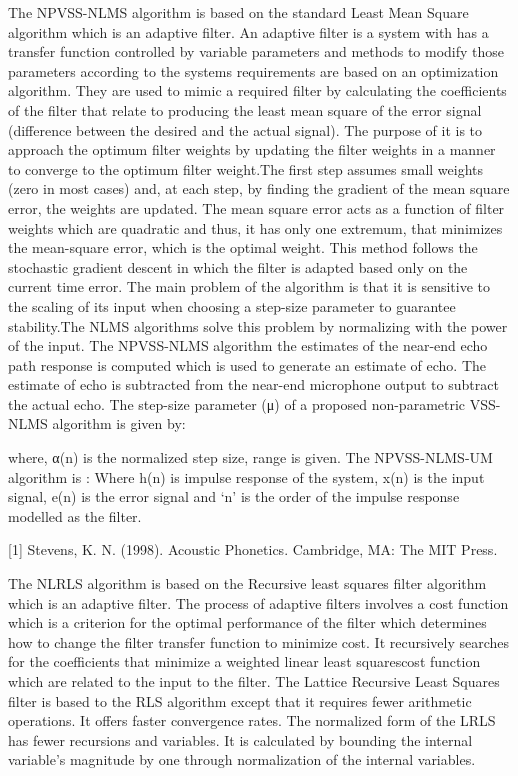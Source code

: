 \documentclass[10pt,twocolumn]{witseiepaper}
\begin{document}
The NPVSS-NLMS algorithm is based on the standard Least Mean Square algorithm which is an adaptive filter. An adaptive filter is a system with has a transfer function controlled by variable parameters and methods to modify those parameters according to the systems requirements are based on an optimization algorithm. They are used to mimic a required filter by calculating the coefficients of the filter that relate to producing the least mean square of the error signal (difference between the desired and the actual signal). The purpose of it is to approach the optimum filter weights by updating the filter weights in a manner to converge to the optimum filter weight.The first step assumes small weights (zero in most cases) and, at each step, by finding the gradient of the mean square error, the weights are updated. The mean square error acts as a function of filter weights which are quadratic and thus, it has only one extremum, that minimizes the mean-square error, which is the optimal weight. 
This method follows the stochastic gradient descent in which the filter is adapted based only on the current time error. The main problem of the algorithm is that it is sensitive to the scaling of its input when choosing a step-size parameter to guarantee stability.The NLMS algorithms solve this problem by normalizing with the power of the input. 
The NPVSS-NLMS algorithm the estimates of the near-end echo path response is computed which is used to generate an estimate of echo. The estimate of echo is subtracted from the near-end microphone output to subtract the actual echo. The step-size parameter (μ) of a proposed non-parametric VSS-NLMS algorithm is given by:

where, α(n) is the normalized step size, range is given.
The NPVSS-NLMS-UM algorithm is : 
Where h(n) is impulse response of the system, x(n) is the input signal, e(n) is the error signal and ‘n’ is the order of the impulse response modelled as the filter.


[1] Stevens, K. N. (1998). Acoustic Phonetics. Cambridge, MA: The MIT Press.

The NLRLS algorithm is based on the Recursive least squares filter algorithm which is an adaptive filter. The process of adaptive filters involves a cost function which is a criterion for the optimal performance of the filter which determines how to change the filter transfer function to minimize cost. It recursively searches for the coefficients that minimize a weighted linear least squarescost function which are related to the input to the filter.
The Lattice Recursive Least Squares filter is based to the RLS algorithm except that it requires fewer arithmetic operations. It offers faster convergence rates. The normalized form of the LRLS has fewer recursions and variables. It is calculated by bounding the internal variable’s magnitude by one through normalization of the internal variables.
\end{document}
